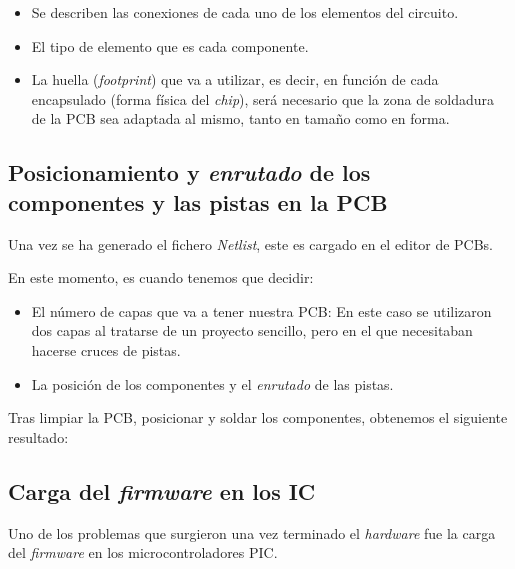 \begin{itemize}
\item
Se describen las conexiones de cada uno de los elementos del circuito.
\item
El tipo de elemento que es cada componente.
\item
La huella (\emph{footprint}) que va a utilizar, es decir, en función de cada encapsulado (forma física del \emph{chip}), será necesario que la zona de soldadura de la PCB sea adaptada al mismo, tanto en tamaño como en forma.
\end{itemize}

\newpage
\subsection{Posicionamiento y \textit{enrutado} de los componentes y las pistas en la PCB}\label{posicionamiento_y_enrutado_de_los_componentes_y_las_pistas_en_la_pcb}

Una vez se ha generado el fichero \emph{Netlist}, este es cargado en el editor de PCBs.

En este momento, es cuando tenemos que decidir:

\begin{itemize}
\item
El número de capas que va a tener nuestra PCB: En este caso se utilizaron dos capas al tratarse de un proyecto sencillo, pero en el que necesitaban hacerse cruces de pistas.
\item
La posición de los componentes y el \textit{enrutado} de las pistas.
\end{itemize}





Tras limpiar la PCB, posicionar y soldar los componentes, obtenemos el siguiente resultado:



\subsection{Carga del \emph{firmware} en los IC}\label{carga_firm_pic}

Uno de los problemas que surgieron una vez terminado el \emph{hardware} fue la carga del \emph{firmware}\cite{firmwarePic} en los microcontroladores PIC.

